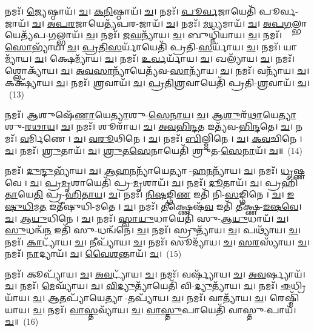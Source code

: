 𑌨𑌮𑌃᳴। \ul{𑌜𑍍𑌯𑍇}\-𑌷𑍍𑌠𑌾𑌯᳴। \ul{𑌚}\-। \ul{𑌕}\-\-\ul{𑌨𑌿}\-𑌷𑍍𑌠𑌾𑌯᳴। \ul{𑌚}\-। 
𑌨𑌮𑌃᳴। \ul{𑌪𑍂}\-\-\ul{𑌰𑍍𑌵}\-𑌜𑌾𑌯𑍇𑌤𑌿᳴ 𑌪𑍂𑌰𑍍𑌵-𑌜𑌾𑌯᳴। \ul{𑌚}\-। \ul{𑌅}\-\-\ul{𑌪}\-\-\ul{𑌰}\-𑌜𑌾𑌯𑍇𑌤𑍍𑌯᳴𑌪𑌰-𑌜𑌾𑌯᳴। \ul{𑌚}\-। 
𑌨𑌮𑌃᳴। \ul{𑌮}\-\-\ul{𑌧𑍍𑌯}\-𑌮𑌾𑌯᳴। \ul{𑌚}\-। \ul{𑌅}\-\-\ul{𑌪}\-\-\ul{𑌗}\-𑌲𑍍𑌭𑌾𑌯𑍇𑌤𑍍𑌯᳴𑌪-\-\ul{𑌗}\-𑌲𑍍𑌭𑌾𑌯᳴। \ul{𑌚}\-। 
𑌨𑌮𑌃᳴। \ul{𑌜}\-\-\ul{𑌘}\-𑌨𑍍𑌯𑌾᳴𑌯। \ul{𑌚}\-। 𑌬𑍁𑌧𑍍𑌨𑌿᳴𑌯𑌾𑌯। \ul{𑌚}\-। 
𑌨𑌮𑌃᳴। \ul{𑌸𑍋}\-𑌭𑍍𑌯𑌾᳴𑌯। \ul{𑌚}\-। \ul{𑌪𑍍𑌰}\-\-\ul{𑌤𑌿}\-\-\ul{𑌸}\-𑌰𑍍𑌯𑌾᳴𑌯𑍇𑌤𑌿᳴ 𑌪𑍍𑌰𑌤𑌿-\-\ul{𑌸}\-𑌰𑍍𑌯𑌾᳴𑌯। \ul{𑌚}\-। 
𑌨𑌮𑌃᳴। 𑌯𑌾𑌮𑍍𑌯𑌾᳴𑌯। \ul{𑌚}\-। 𑌕𑍍𑌷𑍇𑌮𑍍𑌯𑌾᳴𑌯। \ul{𑌚}\-। 
𑌨𑌮𑌃᳴। \ul{𑌉}\-\-\ul{𑌰𑍍𑌵}\-𑌰𑍍𑌯𑌾᳴𑌯। \ul{𑌚}\-। 𑌖𑌲𑍍𑌯𑌾᳴𑌯। \ul{𑌚}\-। 
𑌨𑌮𑌃᳴। 𑌶𑍍𑌲𑍋𑌕𑍍𑌯𑌾᳴𑌯। \ul{𑌚}\-। \ul{𑌅}\-\-\ul{𑌵}\-\-\ul{𑌸𑌾}\-𑌨𑍍𑌯𑌾᳴𑌯𑍇𑌤𑍍𑌯᳴𑌵-\-\ul{𑌸𑌾}\-𑌨𑍍𑌯𑌾᳴𑌯। \ul{𑌚}\-। 
𑌨𑌮𑌃᳴। 𑌵𑌨𑍍𑌯𑌾᳴𑌯। \ul{𑌚}\-। 𑌕𑌕𑍍𑌷𑍍𑌯𑌾᳴𑌯। \ul{𑌚}\-। 
𑌨𑌮𑌃᳴। \ul{𑌶𑍍𑌰}\-𑌵𑌾𑌯᳴। \ul{𑌚}\-। \ul{𑌪𑍍𑌰}\-\-\ul{𑌤𑌿}\-\-\ul{𑌶𑍍𑌰}\-𑌵𑌾𑌯𑍇𑌤𑌿᳴ 𑌪𑍍𑌰𑌤𑌿-\-\ul{𑌶𑍍𑌰}\-𑌵𑌾𑌯᳴। \ul{𑌚}\-।~(13)


𑌨𑌮𑌃᳴। \ul{𑌆}\-𑌶𑍁𑌷𑍇᳴\-\ul{𑌣𑌾}\-𑌯𑍇\-\ul{𑌤𑍍𑌯𑌾}\-𑌶𑍁-\-\ul{𑌸𑍇}\-\-\ul{𑌨𑌾}\-\-\ul{𑌯}\-। \ul{𑌚}\-। \ul{𑌆}\-\-\ul{𑌶𑍁}\-𑌰᳴\-\ul{𑌥𑌾}\-𑌯𑍇\-\ul{𑌤𑍍𑌯𑌾}\-𑌶𑍁-\-\ul{𑌰}\-\-\ul{𑌥𑌾}\-\-\ul{𑌯}\-। \ul{𑌚}\-। 
𑌨𑌮𑌃᳴। 𑌶𑍂𑌰𑌾᳴𑌯। \ul{𑌚}\-। \ul{𑌅}\-\-\ul{𑌵}\-\-\ul{𑌭𑌿}\-\-\ul{𑌨𑍍𑌦}\-𑌤 𑌇𑌤𑍍𑌯᳴𑌵-\-\ul{𑌭𑌿}\-\-\ul{𑌨𑍍𑌦}\-𑌤𑍇। \ul{𑌚}\-। 
𑌨𑌮𑌃᳴। \ul{𑌵}\-𑌰𑍍𑌮𑌿𑌣𑍇। \ul{𑌚}\-। \ul{𑌵}\-\-\ul{𑌰𑍂}\-𑌥𑌿𑌨𑍇। \ul{𑌚}\-। 
𑌨𑌮𑌃᳴। \ul{𑌬𑌿}\-𑌲𑍍𑌮𑌿𑌨𑍇। \ul{𑌚}\-। \ul{𑌕}\-\-\ul{𑌵}\-𑌚𑌿𑌨𑍇। \ul{𑌚}\-। 
𑌨𑌮𑌃᳴। \ul{𑌶𑍍𑌰𑍁}\-𑌤𑌾𑌯᳴। \ul{𑌚}\-। \ul{𑌶𑍍𑌰𑍁}\-\-\ul{𑌤}\-\-\ul{𑌸𑍇}\-𑌨𑌾𑌯𑍇𑌤𑌿᳴ 𑌶𑍍𑌰𑍁𑌤-\-\ul{𑌸𑍇}\-\-\ul{𑌨𑌾}\-𑌯᳴। \ul{𑌚}\-॥~(14)


𑌨𑌮𑌃᳴। \ul{𑌦𑍁}\-\-\ul{𑌨𑍍𑌦𑍁}\-𑌭𑍍𑌯𑌾᳴𑌯। \ul{𑌚}\-। \ul{𑌆}\-\-\ul{𑌹}\-\-\ul{𑌨}\-𑌨𑍍𑌯𑌾᳴𑌯𑍇𑌤𑍍𑌯𑌾-\-\ul{𑌹}\-\-\ul{𑌨}\-𑌨𑍍𑌯𑌾᳴𑌯। \ul{𑌚}\-। 
𑌨𑌮𑌃᳴। \ul{𑌧𑍃}\-𑌷𑍍𑌣𑌵𑍇। \ul{𑌚}\-। \ul{𑌪𑍍𑌰}\-\-\ul{𑌮𑍃}\-𑌶𑌾𑌯𑍇𑌤𑌿᳴ 𑌪𑍍𑌰-\-\ul{𑌮𑍃}\-𑌶𑌾𑌯᳴। \ul{𑌚}\-। 
𑌨𑌮𑌃᳴। \ul{𑌦𑍂}\-𑌤𑌾𑌯᳴। \ul{𑌚}\-। 𑌪𑍍𑌰𑌹𑌿᳴\-\ul{𑌤𑌾}\-𑌯𑍇\-\ul{𑌤𑌿} 𑌪𑍍𑌰-\-\ul{𑌹𑌿}\-\-\ul{𑌤𑌾}\-\-\ul{𑌯}\-। \ul{𑌚}\-। 
𑌨𑌮𑌃᳴। \ul{𑌨𑌿}\-\-\ul{𑌷}\-𑌙𑍍𑌗𑌿\-\ul{𑌣} 𑌇𑌤𑌿᳴ 𑌨𑌿-\-\ul{𑌸}\-𑌙𑍍𑌗𑌿𑌨𑍇। \ul{𑌚}\-। \ul{𑌇}\-\-\ul{𑌷𑍁}\-\-\ul{𑌧𑌿}\-𑌮\-\ul{𑌤} 𑌇𑌤𑍀᳴𑌷𑍁𑌧𑌿-𑌮𑌤𑍇। \ul{𑌚}\-। 
𑌨𑌮𑌃᳴। \ul{𑌤𑍀}\-𑌕𑍍𑌷𑍍𑌣𑍇𑌷᳴\-\ul{𑌵} 𑌇𑌤𑌿᳴ \ul{𑌤𑍀}\-𑌕𑍍𑌷𑍍𑌣-\-\ul{𑌇}\-\-\ul{𑌷}\-\-\ul{𑌵𑍇}\-। \ul{𑌚}\-। \ul{𑌆}\-\-\ul{𑌯𑍁}\-𑌧𑌿𑌨𑍇। \ul{𑌚}\-। 
𑌨𑌮𑌃᳴। \ul{𑌸𑍍𑌵𑌾}\-\-\ul{𑌯𑍁}\-𑌧𑌾𑌯𑍇𑌤𑌿᳴ 𑌸𑍁-\-\ul{𑌆}\-\-\ul{𑌯𑍁}\-𑌧𑌾𑌯᳴। \ul{𑌚}\-। \ul{𑌸𑍁}\-𑌧𑌨𑍍𑌵᳴\-\ul{𑌨} 𑌇𑌤𑌿᳴ 𑌸𑍁-𑌧𑌨𑍍𑌵᳴𑌨𑍇। \ul{𑌚}\-। 
𑌨𑌮𑌃᳴। 𑌸𑍍𑌰𑍁𑌤𑍍𑌯𑌾᳴𑌯। \ul{𑌚}\-। 𑌪𑌥𑍍𑌯𑌾᳴𑌯। \ul{𑌚}\-। 
𑌨𑌮𑌃᳴। \ul{𑌕𑌾}\-𑌟𑍍𑌯𑌾᳴𑌯। \ul{𑌚}\-। \ul{𑌨𑍀}\-𑌪𑍍𑌯𑌾᳴𑌯। \ul{𑌚}\-। 
𑌨𑌮𑌃᳴। 𑌸𑍂𑌦𑍍𑌯𑌾᳴𑌯। \ul{𑌚}\-। \ul{𑌸}\-\-\ul{𑌰}\-𑌸𑍍𑌯𑌾᳴𑌯। \ul{𑌚}\-। 
𑌨𑌮𑌃᳴। \ul{𑌨𑌾}\-𑌦𑍍𑌯𑌾𑌯᳴। \ul{𑌚}\-। \ul{𑌵𑍈}\-\-\ul{𑌶}\-𑌨𑍍𑌤𑌾𑌯᳴। \ul{𑌚}\-।~(15)


𑌨𑌮𑌃᳴। 𑌕𑍂𑌪𑍍𑌯𑌾᳴𑌯। \ul{𑌚}\-। \ul{𑌅}\-\-\ul{𑌵}\-𑌟𑍍𑌯𑌾᳴𑌯। \ul{𑌚}\-। 
𑌨𑌮𑌃᳴। 𑌵𑌰𑍍𑌷𑍍𑌯𑌾᳴𑌯। \ul{𑌚}\-। \ul{𑌅}\-\-\ul{𑌵}\-𑌰𑍍𑌷𑍍𑌯𑌾𑌯᳴। \ul{𑌚}\-। 
𑌨𑌮𑌃᳴। \ul{𑌮𑍇}\-𑌘𑍍𑌯𑌾᳴𑌯। \ul{𑌚}\-। \ul{𑌵𑌿}\-\-\ul{𑌦𑍍𑌯𑍁}\-𑌤𑍍𑌯𑌾᳴𑌯𑍇𑌤𑌿᳴ 𑌵𑌿-\-\ul{𑌦𑍍𑌯𑍁}\-𑌤𑍍𑌯𑌾᳴𑌯। \ul{𑌚}\-। 
𑌨𑌮𑌃᳴। \ul{𑌈}\-𑌧𑍍𑌰𑌿𑌯𑌾᳴𑌯। \ul{𑌚}\-। \ul{𑌆}\-\-\ul{𑌤}\-𑌪𑍍𑌯𑌾᳴𑌯𑍇𑌤𑍍𑌯𑌾-\-\ul{𑌤}\-𑌪𑍍𑌯𑌾᳴𑌯। \ul{𑌚}\-। 
𑌨𑌮𑌃᳴। 𑌵𑌾𑌤𑍍𑌯𑌾᳴𑌯। \ul{𑌚}\-। 𑌰𑍇𑌷𑍍𑌮𑌿᳴𑌯𑌾𑌯। \ul{𑌚}\-। 
𑌨𑌮𑌃᳴। \ul{𑌵𑌾}\-\-\ul{𑌸𑍍𑌤}\-𑌵𑍍𑌯𑌾᳴𑌯। \ul{𑌚}\-। \ul{𑌵𑌾}\-\-\ul{𑌸𑍍𑌤𑍁}\-𑌪𑌾𑌯𑍇𑌤𑌿᳴ 𑌵𑌾𑌸𑍍𑌤𑍁-𑌪𑌾𑌯᳴। \ul{𑌚}\-॥~(16)


